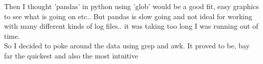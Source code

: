 \documentclass[
	letterpaper, %
	10pt, %
	unnumberedsections, %
	twoside, %
]{APAAssignment}
\begin{document}
\begin{appendices}
	Then I thought 'pandas' in python using 'glob' would be a good fit, easy graphics to see what is going on etc.. But pandas is slow going and not ideal for working with many different kinds of log files.. it was taking too long I was running out of time. \\

	So I decided to poke around the data using grep and awk. It proved to be, bay far the quickest and also the most intuitive

\end{appendices}
\end{document}
